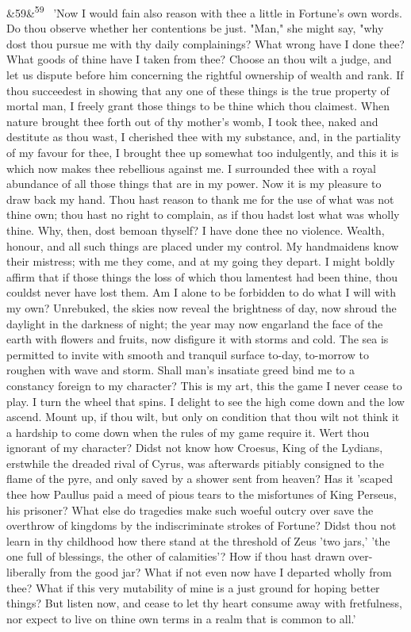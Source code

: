 \documentclass[12pt]{article}
\newcommand{\para}[1][]{\par\noindent\ifx&#1&\else\textsuperscript{\footnotesize #1}~\fi}
\begin{document}
\para[59] 'Now I would fain also reason with thee a little in Fortune's own words. Do thou observe whether her contentions be just. "Man," she might say, "why dost thou pursue me with thy daily complainings? What wrong have I done thee? What goods of thine have I taken from thee? Choose an thou wilt a judge, and let us dispute before him concerning the rightful ownership of wealth and rank. If thou succeedest in showing that any one of these things is the true property of mortal man, I freely grant those things to be thine which thou claimest. When nature brought thee forth out of thy mother's womb, I took thee, naked and destitute as thou wast, I cherished thee with my substance, and, in the partiality of my favour for thee, I brought thee up somewhat too indulgently, and this it is which now makes thee rebellious against me. I surrounded thee with a royal abundance of all those things that are in my power. Now it is my pleasure to draw back my hand. Thou hast reason to thank me for the use of what was not thine own; thou hast no right to complain, as if thou hadst lost what was wholly thine. Why, then, dost bemoan thyself? I have done thee no violence. Wealth, honour, and all such things are placed under my control. My handmaidens know their mistress; with me they come, and at my going they depart. I might boldly affirm that if those things the loss of which thou lamentest had been thine, thou couldst never have lost them. Am I alone to be forbidden to do what I will with my own? Unrebuked, the skies now reveal the brightness of day, now shroud the daylight in the darkness of night; the year may now engarland the face of the earth with flowers and fruits, now disfigure it with storms and cold. The sea is permitted to invite with smooth and tranquil surface to-day, to-morrow to roughen with wave and storm. Shall man's insatiate greed bind me to a constancy foreign to my character? This is my art, this the game I never cease to play. I turn the wheel that spins. I delight to see the high come down and the low ascend. Mount up, if thou wilt, but only on condition that thou wilt not think it a hardship to come down when the rules of my game require it. Wert thou ignorant of my character? Didst not know how Croesus, King of the Lydians, erstwhile the dreaded rival of Cyrus, was afterwards pitiably consigned to the flame of the pyre, and only saved by a shower sent from heaven? Has it 'scaped thee how Paullus paid a meed of pious tears to the misfortunes of King Perseus, his prisoner? What else do tragedies make such woeful outcry over save the overthrow of kingdoms by the indiscriminate strokes of Fortune? Didst thou not learn in thy childhood how there stand at the threshold of Zeus 'two jars,' 'the one full of blessings, the other of calamities'? How if thou hast drawn over-liberally from the good jar? What if not even now have I departed wholly from thee? What if this very mutability of mine is a just ground for hoping better things? But listen now, and cease to let thy heart consume away with fretfulness, nor expect to live on thine own terms in a realm that is common to all.'
\end{document}
